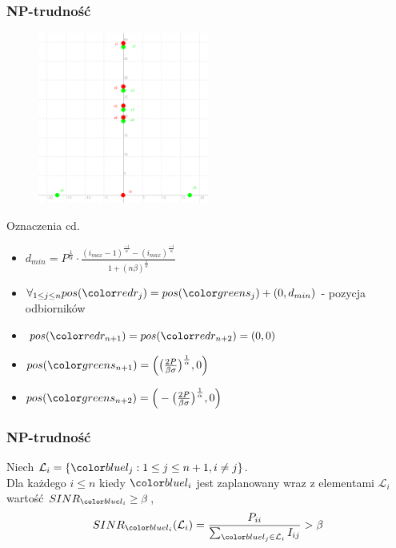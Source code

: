 \documentclass[polish, t,10pt]{beamer}
\begin{document}
\begin{frame}
    \frametitle{NP-trudność}
    \begin{figure}
        \includegraphics[width=0.5\textwidth]{pictures/np-placement2.png}
    \end{figure}
    \begin{block}{Oznaczenia cd.}
        \begin{itemize}
            \item $d_{min} = P^\frac{1}{\alpha}\cdot\frac{(i_{max}-1)^\frac{-1}{\alpha}-(i_{max})^\frac{-1}{\alpha}}{1+(n\beta)^\frac{1}{\alpha}}$
            \item $\forall_{1 \leq j \leq n} pos(\rj) = pos(\sj) + (0, d_{min})$ - pozycja odbiorników
            \item $pos(\rno) = pos(\rnt) = (0, 0)$
            \item $pos(\sno) = \Big(\big(\frac{2P}{\beta\sigma}\big)^\frac{1}{\alpha}, 0\Big)$
            \item $pos(\snt) = \Big(-\big(\frac{2P}{\beta\sigma}\big)^\frac{1}{\alpha}, 0\Big)$
        \end{itemize}
    \end{block}
\end{frame}
\begin{frame}
    \frametitle{NP-trudność}
    \begin{lemma}
        Niech $\mathcal{L}_i = \{\lj: 1 \leq j \leq n + 1, i \neq j\}$.\\
        Dla każdego $i \leq n$ kiedy $\li$ jest zaplanowany wraz z elementami $\mathcal{L}_i$ wartość $SINR_\li \ge \beta$,
        $$
            SINR_\li(\mathcal{L}_i) = \frac{P_{ii}}{\sum_{\lj \in \mathcal{L}_i} I_{ij}} > \beta
        $$
    \end{lemma}
\end{frame}
\end{document}
